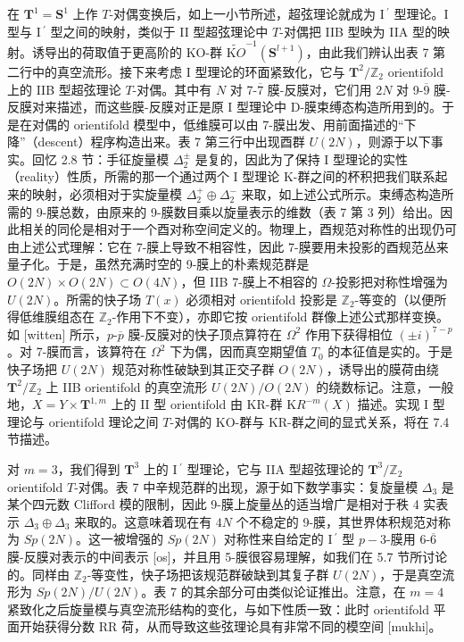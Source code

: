 \documentclass[11pt,a4paper]{ctexart}
\begin{document}
在 \({\mathbf T}^1={\mathbf S}^1\) 上作 \(T\)-对偶变换后，如上一小节所述，超弦理论就成为 I\(\,^\prime\) 型理论。I 型与 I\(\,^\prime\) 型之间的映射，类似于 II 型超弦理论中 \(T\)-对偶把 IIB 型映为 IIA 型的映射。诱导出的荷取值于更高阶的 KO-群 \(\widetilde{{\mathrm KO}}^{-1}({\mathbf S}^{l+1})\)，由此我们辨认出表 7 第二行中的真空流形。接下来考虑 I 型理论的环面紧致化，它与 \({\mathbf T}^2/{\mathbb{Z}}_2\) orientifold 上的 IIB 型超弦理论 \(T\)-对偶。其中有 \(N\) 对 7-\(\overline{7}\) 膜-反膜对，它们用 \(2N\) 对 9-\(\overline{9}\) 膜-反膜对来描述，而这些膜-反膜对正是原 I 型理论中 D-膜束缚态构造所用到的。于是在对偶的 orientifold 模型中，低维膜可以由 7-膜出发、用前面描述的``下降''（descent）程序构造出来。表 7 第三行中出现酉群 \(U(2N)\)，则源于以下事实。回忆 2.8 节：手征旋量模 \(\Delta_2^\pm\) 是复的，因此为了保持 I 型理论的实性（reality）性质，所需的那一个通过两个 I 型理论 K-群之间的杯积把我们联系起来的映射，必须相对于实旋量模 \(\Delta_2^+\oplus\Delta_2^-\) 来取，如上述公式所示。束缚态构造所需的 9-膜总数，由原来的 9-膜数目乘以旋量表示的维数（表 7 第 3 列）给出。因此相关的同伦是相对于一个酉对称空间定义的。物理上，酉规范对称性的出现仍可由上述公式理解：它在 7-膜上导致不相容性，因此 7-膜要用未投影的酉规范丛来量子化。于是，虽然充满时空的 9-膜上的朴素规范群是 \(O(2N)\times O(2N)\subset O(4N)\)，但 IIB 7-膜上不相容的 \(\Omega\)-投影把对称性增强为 \(U(2N)\)。所需的快子场 \(T(x)\) 必须相对 orientifold 投影是 \({\mathbb{Z}}_2\)-等变的（以便所得低维膜组态在 \({\mathbb{Z}}_2\)-作用下不变），亦即它按 orientifold 群像上述公式那样变换。如 [witten] 所示，\(p\)-\(\overline{p}\) 膜-反膜对的快子顶点算符在 \(\Omega^2\) 作用下获得相位 \((\pm i)^{7-p}\)。对 7-膜而言，该算符在 \(\Omega^2\) 下为偶，因而真空期望值 \(T_0\) 的本征值是实的。于是快子场把 \(U(2N)\) 规范对称性破缺到其正交子群 \(O(2N)\)，诱导出的膜荷由绕 \({\mathbf T}^2/{\mathbb{Z}}_2\) 上 IIB orientifold 的真空流形 \(U(2N)/O(2N)\) 的绕数标记。注意，一般地，\(X=Y\times {\mathbf T}^{1,m}\) 上的 II 型 orientifold 由 KR-群 \({\mathrm KR}^{-m}(X)\) 描述。实现 I 型理论与 orientifold 理论之间 \(T\)-对偶的 KO-群与 KR-群之间的显式关系，将在 7.4 节描述。

对 \(m=3\)，我们得到 \({\mathbf T}^3\) 上的 I\(\,^\prime\) 型理论，它与 IIA 型超弦理论的 \({\mathbf T}^3/{\mathbb{Z}}_2\) orientifold \(T\)-对偶。表 7 中辛规范群的出现，源于如下数学事实：复旋量模 \(\Delta_3\) 是某个四元数 Clifford 模的限制，因此 9-膜上旋量丛的适当增广是相对于秩 4 实表示 \(\Delta_3\oplus\Delta_3\) 来取的。这意味着现在有 \(4N\) 个不稳定的 9-膜，其世界体积规范对称为 \(Sp(2N)\)。这一被增强的 \(Sp(2N)\) 对称性来自给定的 I\(\,^\prime\) 型 \(p-3\)-膜用 6-\(\overline{6}\) 膜-反膜对表示的中间表示 [os]，并且用 5-膜很容易理解，如我们在 5.7 节所讨论的。同样由 \({\mathbb{Z}}_2\)-等变性，快子场把该规范群破缺到其复子群 \(U(2N)\)，于是真空流形为 \(Sp(2N)/U(2N)\)。表 7 的其余部分可由类似论证推出。注意，在 \(m=4\) 紧致化之后旋量模与真空流形结构的变化，与如下性质一致：此时 orientifold 平面开始获得分数 RR 荷，从而导致这些弦理论具有非常不同的模空间 [mukhi]。
\end{document}
